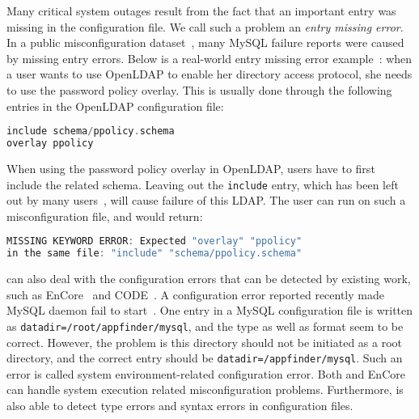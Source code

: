 Many critical system outages result from the fact that an important
entry was missing in the configuration file. 
We call such a problem an {\em entry missing error}.
In a public misconfiguration dataset~\cite{configdataset},
many MySQL failure reports were caused by
missing entry errors.
Below is a real-world entry missing error example~\cite{yin11anempirical}:
when a user wants to use OpenLDAP to enable her directory access
protocol, she needs to use the password policy overlay. This is usually
done through the following entries in the OpenLDAP configuration file:

\begin{lstlisting}[language=C, xleftmargin=.01\textwidth]
include schema/ppolicy.schema
overlay ppolicy
\end{lstlisting} 

When using the password policy overlay in OpenLDAP, 
users have to first include the related schema.
Leaving out the {\tt include} entry, 
which has been left out by many users~\cite{yin11anempirical}, 
will cause failure of this LDAP. 
The user can run \app on such a misconfiguration file,
and \app would return:

\begin{lstlisting}[language=C, xleftmargin=.01\textwidth]
MISSING KEYWORD ERROR: Expected "overlay" "ppolicy"
in the same file: "include" "schema/ppolicy.schema"
\end{lstlisting} 


\app can also deal with the configuration errors that can be detected by
existing work, such as EnCore~\cite{zhang14encore} and
CODE~\cite{yuan11context}.
A configuration error reported recently made MySQL
daemon fail to start~\cite{syserror}.
One entry in a MySQL configuration file is written as 
{\tt datadir=/root/appfinder/mysql}, and the type as well as 
format seem to be correct.
However, the problem is this directory should not be
initiated as a root directory, and the correct entry
should be {\tt datadir=/appfinder/mysql}.
Such an error is called system environment-related configuration error.
Both \app and EnCore can handle system execution related
misconfiguration problems.
Furthermore, \app is also able to detect type errors and syntax errors
in configuration files.

